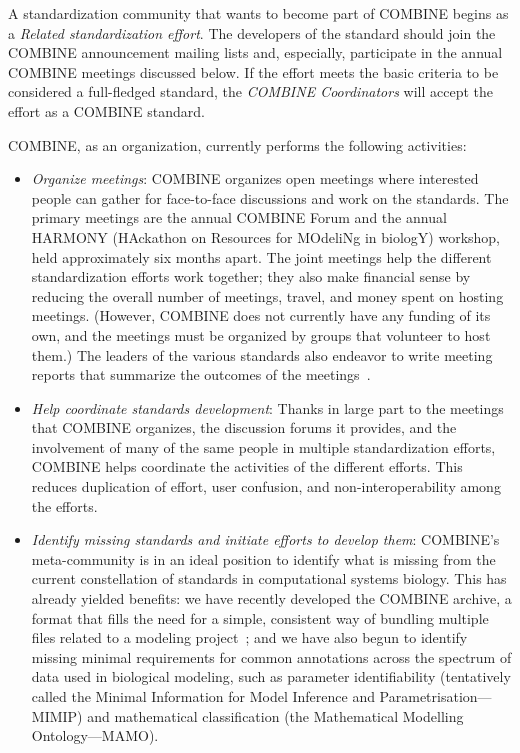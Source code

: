 A standardization community that wants to become part of COMBINE begins as a \emph{Related standardization effort}.  The developers of the standard should join the COMBINE announcement mailing lists and, especially, participate in the annual COMBINE meetings discussed below.  If the effort meets the basic criteria to be considered a full-fledged standard, the \emph{COMBINE Coordinators} will accept the effort as a COMBINE standard.



COMBINE, as an organization, currently performs the following activities:
\vspace*{-1em}
\begin{itemize}

\item \emph{Organize meetings}: COMBINE organizes open meetings where interested people can gather for face-to-face discussions and work on the standards.  The primary meetings are the annual COMBINE Forum and the annual HARMONY (HAckathon on Resources for MOdeliNg in biologY) workshop, held approximately six months apart.  The joint meetings help the different standardization efforts work together; they also make financial sense by reducing the overall number of meetings, travel, and money spent on hosting meetings.  (However, COMBINE does not currently have any funding of its own, and the meetings must be organized by groups that volunteer to host them.)  The leaders of the various standards also endeavor to write meeting reports that summarize the outcomes of the meetings~\citep[e.g.,][]{le2011meeting, waltemath2014meeting}.

\item \emph{Help coordinate standards development}: Thanks in large part to the meetings that COMBINE organizes, the discussion forums it provides, and the involvement of many of the same people in multiple standardization efforts, COMBINE helps coordinate the activities of the different efforts.  This reduces duplication of effort, user confusion, and non-interoperability among the efforts.

\item \emph{Identify missing standards and initiate efforts to develop them}: COMBINE's meta-community is in an ideal position to identify what is missing from the current constellation of standards in computational systems biology.  This has already yielded benefits: we have recently developed the COMBINE archive, a format that fills the need for a simple, consistent way of bundling multiple files related to a modeling project~\cite[\url{http://co.mbine.org/standards/omex};][]{Bergmann2014combine}; and we have also begun to identify missing minimal requirements for common annotations across the spectrum of data used in biological modeling, such as parameter identifiability (tentatively called the Minimal Information for Model Inference and Parametrisation---MIMIP) and mathematical classification (the Mathematical Modelling Ontology---MAMO).


\end{itemize}
